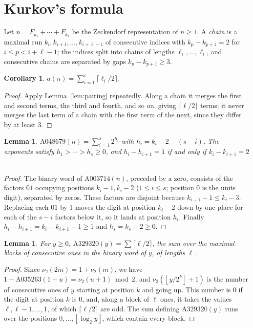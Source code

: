 \documentclass[]{interact}
\newcommand{\fl}[1]{\left\lfloor #1\right\rfloor}
\theoremstyle{plain}
\numberwithin{equation}{section}
\newtheorem{lemma}[thm]{Lemma}
\newtheorem{corollary}[thm]{Corollary}
\theoremstyle{definition}
\begin{document}
\section{Kurkov's formula}\label{sec:kurkov}

Let $n=F_{k_1}+\cdots+F_{k_s}$ be the Zeckendorf representation of $n\ge1$. A \emph{chain} is a maximal run $k_i,k_{i+1},\dots,k_{i+\ell-1}$ of consecutive indices with $k_{p}-k_{p+1}=2$ for $i\le p<i+\ell-1$; the indices split into chains of lengths $\ell_1,\dots,\ell_t$, and consecutive chains are separated by gaps $k_p-k_{p+1}\ge3$.

\begin{corollary}\label{cor:chains}
$a(n)=\sum_{i=1}^t\lceil\ell_i/2\rceil$.
\end{corollary}

\begin{proof}
Apply Lemma~\ref{lem:pairing} repeatedly. Along a chain it merges the first and second terms, the third and fourth, and so on, giving $\lceil\ell/2\rceil$ terms; it never merges the last term of a chain with the first term of the next, since they differ by at least $3$.
\end{proof}

\begin{lemma}\label{lem:compress}
$\mathrm{A048679}(n)=\sum_{i=1}^s2^{h_i}$ with $h_i=k_i-2-(s-i)$. The exponents satisfy $h_1>\cdots>h_s\ge0$, and $h_i-h_{i+1}=1$ if and only if $k_i-k_{i+1}=2$.
\end{lemma}

\begin{proof}
The binary word of $\mathrm{A003714}(n)$, preceded by a zero, consists of the factors $01$ occupying positions $k_i-1,k_i-2$ ($1\le i\le s$; position $0$ is the units digit), separated by zeros. These factors are disjoint because $k_{i+1}-1\le k_i-3$. Replacing each $01$ by $1$ moves the digit at position $k_i-2$ down by one place for each of the $s-i$ factors below it, so it lands at position $h_i$. Finally $h_i-h_{i+1}=k_i-k_{i+1}-1\ge1$ and $h_s=k_s-2\ge0$.
\end{proof}

\begin{lemma}\label{lem:A329320}
For $y\ge0$, $\mathrm{A329320}(y)=\sum\lceil\ell/2\rceil$, the sum over the maximal blocks of consecutive ones in the binary word of $y$, of lengths $\ell$.
\end{lemma}

\begin{proof}
Since $\nu_2(2m)=1+\nu_2(m)$, we have $1-\mathrm{A035263}(1+u)=\nu_2(u+1)\bmod2$, and $\nu_2(\fl{y/2^k}+1)$ is the number of consecutive ones of $y$ starting at position $k$ and going up. This number is $0$ if the digit at position $k$ is $0$, and, along a block of $\ell$ ones, it takes the values $\ell,\ell-1,\dots,1$, of which $\lceil\ell/2\rceil$ are odd. The sum defining $\mathrm{A329320}(y)$ runs over the positions $0,\dots,\fl{\log_2y}$, which contain every block.
\end{proof}
\end{document}
